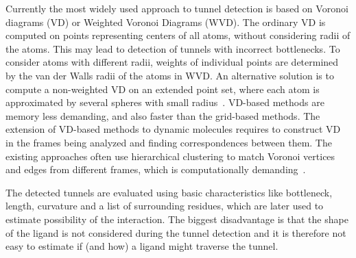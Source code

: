 \documentclass{svmult}
\begin{document}
Currently the most widely used approach to tunnel detection is based on Voronoi diagrams (VD) or Weighted Voronoi Diagrams (WVD).
The ordinary VD is computed on points representing centers of all atoms, without considering radii of the atoms.
This may lead to detection of tunnels with incorrect bottlenecks. %
To consider atoms with different radii, weights of individual points are determined by the van der Walls radii of the atoms in WVD.
An alternative solution is to compute a non-weighted VD on an extended point set, where 
each atom is approximated by several spheres with small radius~\cite{yaffe2008,caver3}.
VD-based methods are memory less demanding, and also faster than the grid-based methods.
The extension of VD-based methods to dynamic molecules requires to construct VD in the frames being analyzed and 
finding correspondences between them.
The existing approaches often use hierarchical clustering to match Voronoi vertices and edges from different frames, which is computationally demanding~\cite{lindow2012dynamic,caverDetails}.

The detected tunnels are evaluated using basic characteristics like bottleneck, length, curvature and a list of surrounding
residues, which are later used to estimate possibility of the interaction.
The biggest disadvantage is that the shape of the ligand is not considered during the tunnel detection and it is therefore
not easy to estimate if (and how) a ligand might traverse the tunnel.
\end{document}
